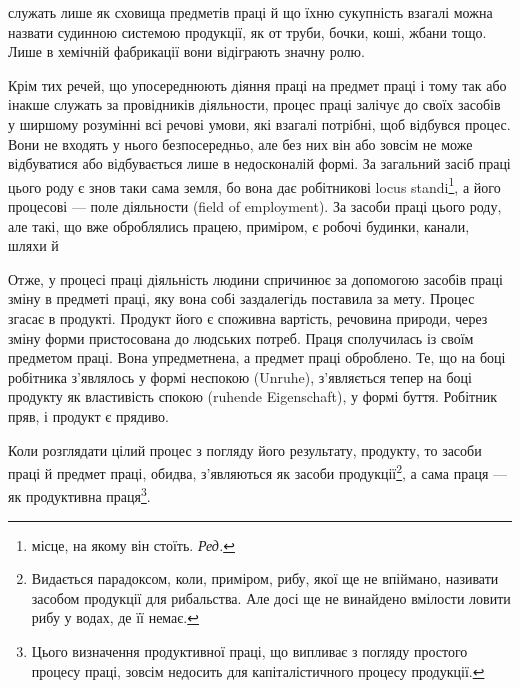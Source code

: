 \parcont{}  %
служать лише як сховища предметів праці й що їхню сукупність
взагалі можна назвати судинною системою продукції, як от
труби, бочки, коші, жбани тощо. Лише в хемічній фабрикації
вони відіграють значну ролю.

Крім тих речей, що упосереднюють діяння праці на предмет
праці і тому так або інакше служать за провідників діяльности,
процес праці залічує до своїх засобів у ширшому розумінні всі
речові умови, які взагалі потрібні, щоб відбувся процес. Вони
не входять у нього безпосередньо, але без них він або зовсім
не може відбуватися або відбувається лише в недосконалій формі.
За загальний засіб праці цього роду є знов таки сама земля, бо
вона дає робітникові locus standi\footnote*{
місце, на якому він стоїть. \emph{Ред.}
}, а його процесові — поле
діяльности (field of employment). За засоби праці цього роду,
але такі, що вже оброблялись працею, приміром, є робочі будинки,
канали, шляхи й~

Отже, у процесі праці діяльність людини спричинює за допомогою
засобів праці зміну в предметі праці, яку вона собі заздалегідь
поставила за мету. Процес згасає в продукті. Продукт його є
споживна вартість, речовина природи, через зміну форми пристосована
до людських потреб. Праця сполучилась із своїм предметом
праці. Вона упредметнена, а предмет праці оброблено. Те, що
на боці робітника з’являлось у формі неспокою (Unruhe), з’являється
тепер на боці продукту як властивість спокою (ruhende
Eigenschaft), у формі буття. Робітник пряв, і продукт є прядиво.

Коли розглядати цілий процес з погляду його результату,
продукту, то засоби праці й предмет праці, обидва, з’являються
як засоби продукції\footnote{
Видається парадоксом, коли, приміром, рибу, якої ще не впіймано,
називати засобом продукції для рибальства. Але досі ще не винайдено
вмілости ловити рибу у водах, де її немає.
}, а сама праця — як продуктивна праця\footnote{
Цього визначення продуктивної праці, що випливає з погляду простого
процесу праці, зовсім недосить для капіталістичного процесу продукції.
}.


